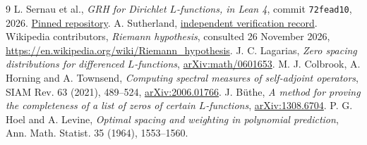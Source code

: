 \documentclass[11pt]{article}
\begin{document}
\begin{thebibliography}{9}
 L. Sernau et al., \emph{GRH for Dirichlet $L$-functions, in Lean 4},
commit \texttt{72fead10}, 2026.
\href{https://github.com/lsernau/grh-lean/tree/72fead102f663d5c7a407964a13dc0cf9d977207}{Pinned repository}.
A. Sutherland, \href{https://math.mit.edu/~drew/shortgrh/}{independent verification record}.
 Wikipedia contributors, \emph{Riemann hypothesis}, consulted
26 November 2026, \url{https://en.wikipedia.org/wiki/Riemann_hypothesis}.
 J. C. Lagarias, \emph{Zero spacing distributions for
differenced $L$-functions}, \href{https://arxiv.org/abs/math/0601653}{arXiv:math/0601653}.
 M. J. Colbrook, A. Horning and A. Townsend,
\emph{Computing spectral measures of self-adjoint operators},
SIAM Rev. 63 (2021), 489--524, \href{https://arxiv.org/abs/2006.01766}{arXiv:2006.01766}.
 J. B\"uthe, \emph{A method for proving the completeness of
a list of zeros of certain $L$-functions}, \href{https://arxiv.org/abs/1308.6704}{arXiv:1308.6704}.
 P. G. Hoel and A. Levine, \emph{Optimal spacing and weighting
in polynomial prediction}, Ann. Math. Statist. 35 (1964), 1553--1560.
\end{thebibliography}
\end{document}
